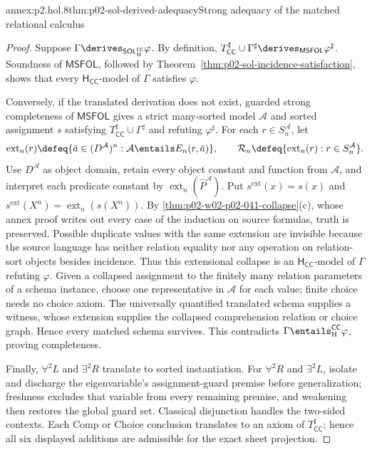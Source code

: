 \begin{annexitem}{annex:p2.hol.8}{thm:p02-sol-derived-adequacy}{Strong adequacy of the matched relational calculus}
\begin{proof}
Suppose
\(\Gamma\derives_{\mathsf{SOL}_{\mathrm H}^{\mathsf{CC}}}\varphi\).
By definition,
\(T_{\mathsf{CC}}^\sharp\cup\Gamma^\sharp
\derives_{\mathsf{MSFOL}}\varphi^\sharp\).  Soundness of
\(\mathsf{MSFOL}\), followed by
Theorem~\ref{thm:p02-sol-incidence-satisfaction}, shows that every
\(\mathsf H_{\mathsf{CC}}\)-model of \(\Gamma\) satisfies \(\varphi\).

Conversely, if the translated derivation does not exist, guarded strong
completeness of \(\mathsf{MSFOL}\) gives a strict many-sorted model
\(\mathcal A\) and sorted assignment \(s\) satisfying
\(T_{\mathsf{CC}}^\sharp\cup\Gamma^\sharp\) and refuting
\(\varphi^\sharp\).  For each \(r\in S_n^{\mathcal A}\), let
\[
 \operatorname{ext}_n(r)\defeq
 \{\bar a\in(D^{\mathcal A})^n:
   \mathcal A\entails E_n(r,\bar a)\},
 \qquad
 \mathcal R_n\defeq
 \{\operatorname{ext}_n(r):r\in S_n^{\mathcal A}\}.
\]
Use \(D^{\mathcal A}\) as object domain, retain every object constant and
function from \(\mathcal A\), and interpret each predicate constant by
\(\operatorname{ext}_n(\widehat P^{\mathcal A})\).  Put
\(s^{\mathrm{ext}}(x)=s(x)\) and
\(s^{\mathrm{ext}}(X^n)=\operatorname{ext}_n(s(X^n))\).  By
\cref{thm:p02-w02-p02-041-collapse}(c), whose annex proof writes out every
case of the induction on source formulas, truth is preserved.  Possible
duplicate values with the same extension are
invisible because the source language has neither relation equality nor any
operation on relation-sort objects besides incidence.  Thus this extensional
collapse is an \(\mathsf H_{\mathsf{CC}}\)-model of \(\Gamma\) refuting
\(\varphi\).  Given a collapsed assignment to the finitely many relation
parameters of a schema instance, choose one representative in \(\mathcal A\)
for each value; finite choice needs no choice axiom.  The universally quantified
translated schema supplies a witness, whose extension supplies the collapsed
comprehension relation or choice graph.  Hence every matched schema survives.
This
contradicts \(\Gamma\entails_{\mathrm H}^{\mathsf{CC}}\varphi\), proving
completeness.

Finally, \(\forall^2L\) and \(\exists^2R\) translate to sorted
instantiation.  For \(\forall^2R\) and \(\exists^2L\), isolate and discharge
the eigenvariable's assignment-guard premise before generalization; freshness
excludes that variable from every remaining premise, and weakening then
restores the global guard set.
Classical disjunction handles the two-sided contexts.  Each Comp or Choice
conclusion translates to an axiom of \(T_{\mathsf{CC}}^\sharp\); hence all
six displayed additions are admissible for the exact sheet projection.
\end{proof}
\end{annexitem}

